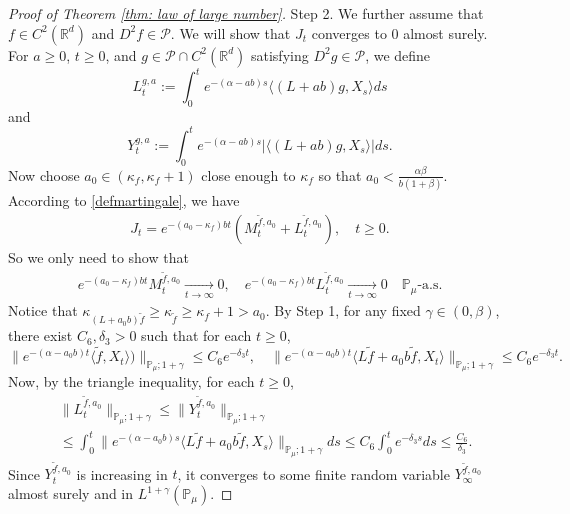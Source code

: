 \documentclass[12pt,a4paper]{amsart}
\theoremstyle{plain}
\theoremstyle{definition}
\numberwithin{equation}{section}
\begin{document}
\begin{proof}[Proof of Theorem \ref{thm: law of large number}]
	Step 2.
    We further assume that $f\in C^2(\mathbb R^d)$ and $D^2f \in \mathcal{P}$.
    We will show that $J_t$ converges to $0$ almost surely.
	For $a \geq 0$, $ t\geq 0$, and $g\in \mathcal{P}\cap C^2(\mathbb{R}^d)$ satisfying $D^2g\in \mathcal{P}$, we define
\begin{equation}
	L_t^{g,a}:=\int_0^t e^{-(\alpha-ab)s}\langle (L+ab)g,X_s\rangle ds
\end{equation}
    and
\begin{equation}
    Y_t^{g,a}
    :=\int_0^t e^{-(\alpha-ab)s}|\langle (L+ab)g,X_s\rangle|ds.
\end{equation}
	Now choose $a_0 \in (\kappa_{f}, \kappa_f + 1)$ close enough to $\kappa_f$ so that $a_0 < \frac{\alpha \beta}{b(1+\beta)}$.
	According to \eqref{defmartingale}, we have
\begin{align}
    J_t
    =e^{-(a_0-\kappa_f)bt} (M_t^{\widetilde{f}, a_0}+L_t^{\widetilde{f}, a_0}),
    \quad t\geq 0.
\end{align}
	So we only need to show that
\begin{align}
    e^{-(a_0-\kappa_f)b t}M_t^{\widetilde{f},a_0}
    \xrightarrow[t\to \infty]{} 0,
    \quad e^{-(a_0-\kappa_f)b t}L_t^{\widetilde{f},a_0}
    \xrightarrow[t\to \infty]{} 0
    \quad \mathbb{P}_{\mu}\text{-a.s.}
\end{align}
    Notice that $\kappa_{(L+a_0 b)\widetilde{f}}\geq \kappa_{\widetilde{f}}\geq \kappa_f+1 > a_0$.
By Step 1, for any fixed $\gamma\in (0,\beta)$, there exist $C_6, \delta_3>0$ such that for each $t\geq 0$,
\begin{equation}
    \|e^{-(\alpha-a_0 b)t}\langle \widetilde{f},X_t\rangle)\|_{\mathbb{P}_{\mu};1+\gamma}
    \leq C_6 e^{-\delta_3 t},
    \quad \|e^{-(\alpha-a_0 b)t}\langle L\widetilde{f}+a_0 b\widetilde{f},X_t\rangle\|_{\mathbb{P}_{\mu};1+\gamma}
    \leq C_6 e^{-\delta_3 t}.
\end{equation}
	Now, by the triangle inequality, for each $t\geq 0$,
\begin{align}
    &\|L_t^{\widetilde{f},a_0}\|_{\mathbb{P}_{\mu};1+\gamma}
    \leq\|Y_t^{\widetilde{f},a_0}\|_{\mathbb{P}_{\mu};1+\gamma}
    \\&\leq \int_0^t \|e^{-(\alpha-a_0 b)s}\langle L\widetilde{f}+a_0 b\widetilde{f},X_s\rangle\|_{\mathbb{P}_{\mu};1+\gamma}ds\leq C_6 \int_0^t e^{-\delta_3 s}ds\leq\frac{C_6}{\delta_3}.
\end{align}
    Since $Y_t^{\widetilde{f},a_0}$ is increasing in $t$, it converges to some finite random variable $Y_{\infty}^{\widetilde{f},a_0}$ almost surely and in $L^{1+\gamma}(\mathbb{P}_{\mu})$.

\end{proof}
\end{document}
